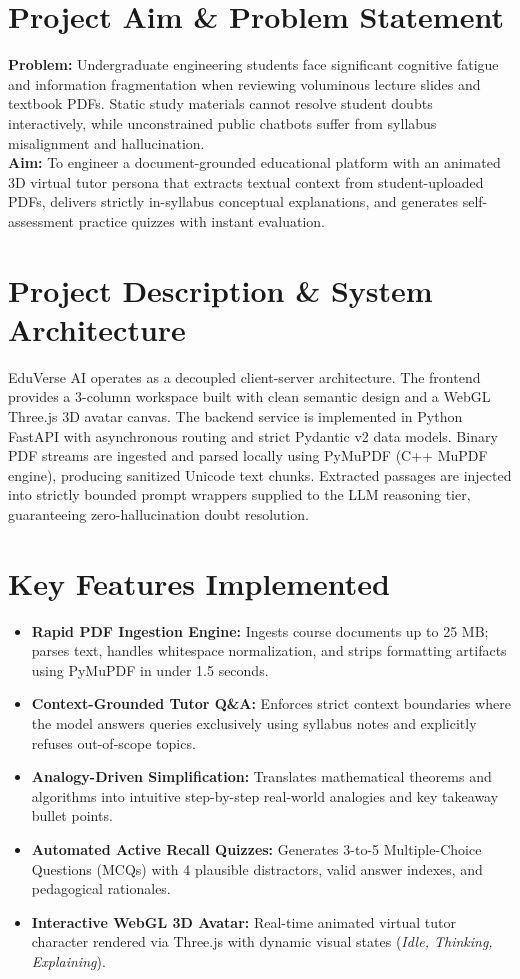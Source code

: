 \documentclass[10pt,a4paper]{article}
\begin{document}
\section{Project Aim \& Problem Statement}
\textbf{Problem:} Undergraduate engineering students face significant cognitive fatigue and information fragmentation when reviewing voluminous lecture slides and textbook PDFs. Static study materials cannot resolve student doubts interactively, while unconstrained public chatbots suffer from syllabus misalignment and hallucination.\\
\textbf{Aim:} To engineer a document-grounded educational platform with an animated 3D virtual tutor persona that extracts textual context from student-uploaded PDFs, delivers strictly in-syllabus conceptual explanations, and generates self-assessment practice quizzes with instant evaluation.

\section{Project Description \& System Architecture}
EduVerse AI operates as a decoupled client-server architecture. The frontend provides a 3-column workspace built with clean semantic design and a WebGL Three.js 3D avatar canvas. The backend service is implemented in Python FastAPI with asynchronous routing and strict Pydantic v2 data models. Binary PDF streams are ingested and parsed locally using PyMuPDF (C++ MuPDF engine), producing sanitized Unicode text chunks. Extracted passages are injected into strictly bounded prompt wrappers supplied to the LLM reasoning tier, guaranteeing zero-hallucination doubt resolution.

\section{Key Features Implemented}
\begin{itemize}[noitemsep, topsep=1pt]
    \item \textbf{Rapid PDF Ingestion Engine:} Ingests course documents up to 25 MB; parses text, handles whitespace normalization, and strips formatting artifacts using PyMuPDF in under 1.5 seconds.
    \item \textbf{Context-Grounded Tutor Q\&A:} Enforces strict context boundaries where the model answers queries exclusively using syllabus notes and explicitly refuses out-of-scope topics.
    \item \textbf{Analogy-Driven Simplification:} Translates mathematical theorems and algorithms into intuitive step-by-step real-world analogies and key takeaway bullet points.
    \item \textbf{Automated Active Recall Quizzes:} Generates 3-to-5 Multiple-Choice Questions (MCQs) with 4 plausible distractors, valid answer indexes, and pedagogical rationales.
    \item \textbf{Interactive WebGL 3D Avatar:} Real-time animated virtual tutor character rendered via Three.js with dynamic visual states (\textit{Idle, Thinking, Explaining}).
\end{itemize}
\end{document}
